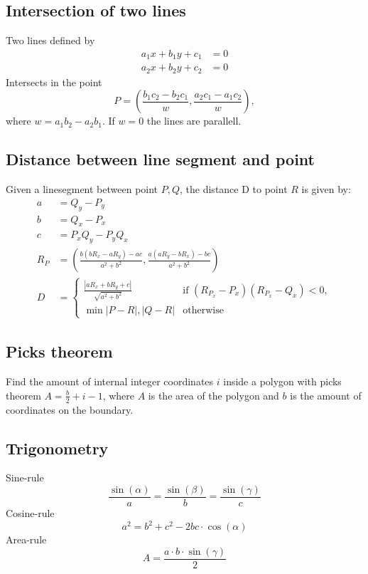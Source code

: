 \documentclass[8pt,a4paper,landscape,oneside]{amsart}
\begin{document}
\begin{multicols*}{2}
\begin{large}
    \subsection{Intersection of two lines}
        Two lines defined by 
        \begin{align*}
            a_1x + b_1y + c_1 &= 0 \\
            a_2x + b_2y + c_2 &= 0 
        \end{align*}
        Intersects in the point 
        $$P = (\frac{b_1c_2 - b_2c_1}{w}, \frac{a_2c_1 - a_1c_2}{w}),$$
        where $w = a_1b_2 - a_2b_1$. If $w = 0$ the lines are parallell.
        \subsection{Distance between line segment and point}
        Given a linesegment between point $P, Q$, the distance D to point $R$ is given by:
        \begin{align*}
            a &= Q_y - P_y \\
            b &= Q_x - P_x \\
            c &= P_xQ_y - P_yQ_x \\
            R_P &= (\frac{b(bR_x - aR_y) - ac}{a^2 + b^2}, \frac{a(aR_y - bR_x) - bc}{a^2 + b^2}) \\
            D &= 
            \begin{cases}
                \frac{|aR_x + bR_y + c|}{\sqrt{a^2 + b^2}} & \text{if $(R_{P_x}- P_x)(R_{P_x} - Q_x) < 0$}, \\
                \min{|P - R|, |Q - R|} & \text{otherwise}
            \end{cases}
        \end{align*}
    \subsection{Picks theorem}
        Find the amount of internal integer coordinates $i$ inside a polygon with picks theorem
        $A = \frac{b}{2} + i - 1$, where $A$ is the area of the polygon and 
        $b$ is the amount of coordinates on the boundary.

    \subsection{Trigonometry}
        Sine-rule $$\frac{\sin(\alpha)}{a} = \frac{\sin(\beta)}{b} = \frac{\sin(\gamma)}{c}$$
        Cosine-rule $$a^2 = b^2 + c^2 - 2bc\cdot \cos(\alpha)$$
        Area-rule $$A = \frac{a\cdot b \cdot \sin(\gamma)}{2}$$

\end{large}
\end{multicols*}
\end{document}
